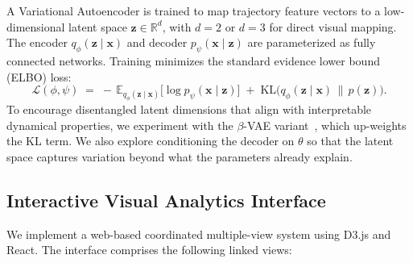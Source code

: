 \documentclass{article}
\begin{document}
A Variational Autoencoder is trained to map trajectory feature vectors to a
low-dimensional latent space $\mathbf{z} \in \mathbb{R}^d$, with $d = 2$ or
$d = 3$ for direct visual mapping. The encoder
$q_\phi(\mathbf{z}\mid\mathbf{x})$ and decoder
$p_\psi(\mathbf{x}\mid\mathbf{z})$ are parameterized as fully connected
networks. Training minimizes the standard evidence lower bound (ELBO) loss:
\begin{equation}
    \mathcal{L}(\phi,\psi) \;=\;
    -\,\mathbb{E}_{q_\phi(\mathbf{z}\mid\mathbf{x})}
        \!\bigl[\log p_\psi(\mathbf{x}\mid\mathbf{z})\bigr]
    \;+\;
    \mathrm{KL}\!\bigl(q_\phi(\mathbf{z}\mid\mathbf{x})
        \,\|\, p(\mathbf{z})\bigr).
\end{equation}
To encourage disentangled latent dimensions that align with interpretable
dynamical properties, we experiment with the $\beta$-VAE
variant~\cite{higgins2017betavae}, which up-weights the KL term. We also
explore conditioning the decoder on $\theta$ so that the latent space captures
variation beyond what the parameters already explain.

\subsection{Interactive Visual Analytics Interface}

We implement a web-based coordinated multiple-view system using D3.js and
React. The interface comprises the following linked views:
\end{document}
